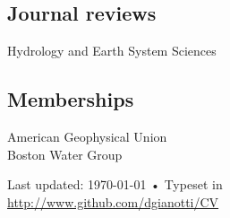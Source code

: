 \documentclass[10pt, a4paper]{article}
\begin{document}
\subsection*{Journal reviews}
Hydrology and Earth System Sciences

\subsection*{Memberships}
American Geophysical Union\\ %
Boston Water Group %

\vfill{}

\begin{center}
{\scriptsize  Last updated: \today\- •\- 
Typeset in \href{http://nitens.org/taraborelli/cvtex}{
\XeTeX }\\
\href{http://www.github.com/dgianotti/CV}{http://www.github.com/dgianotti/CV}}
\end{center}
\end{document}
